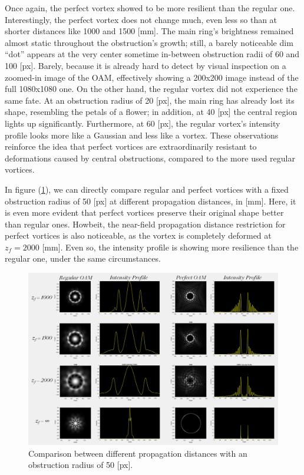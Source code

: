 Once again, the perfect vortex showed to be more resilient than the regular one. Interestingly, the perfect vortex does not change much, even less so than at shorter distances like 1000 and 1500 [mm]. The main ring's brightness remained almost static throughout the obstruction's growth; still, a barely noticeable dim ``dot'' appears at the very center sometime in-between obstruction radii of 60 and 100 [px]. Barely, because it is already hard to detect by visual inspection on a zoomed-in image of the OAM, effectively showing a 200x200 image instead of the full 1080x1080 one. On the other hand, the regular vortex did not experience the same fate. At an obstruction radius of 20 [px], the main ring has already lost its shape, resembling the petals of a flower; in addition, at 40 [px] the central region lights up significantly. Furthermore, at 60 [px], the regular vortex's intensity profile looks more like a Gaussian and less like a vortex. These observations reinforce the idea that perfect vortices are extraordinarily resistant to deformations caused by central obstructions, compared to the more used regular vortices.

\newpage
In figure (\ref{fig:r=50_comparison}), we can directly compare regular and perfect vortices with a fixed obstruction radius of 50 [px] at different propagation distances, in [mm]. Here, it is even more evident that perfect vortices preserve their original shape better than regular ones. Howbeit, the near-field propagation distance restriction for perfect vortices is also noticeable, as the vortex is completely deformed at $z_f = 2000$ [mm]. Even so, the intensity profile is showing more resilience than the regular one, under the same circumstances. 

\begin{figure}[htbp]
    \centering
    \includegraphics[width=\textwidth]{images/c04/r=50_distance_comparison.png}
    \caption{Comparison between different propagation distances with an obstruction radius of 50 [px].}
    \label{fig:r=50_comparison}
\end{figure}



